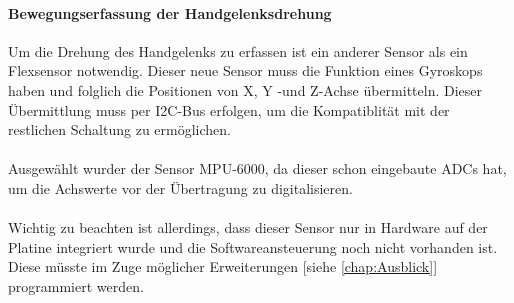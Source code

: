 \documentclass[titlepage,12pt,twoside]{article}
\begin{document}
\paragraph{Bewegungserfassung der Handgelenksdrehung}
\hfill \break
\hfill \break
Um die Drehung des Handgelenks zu erfassen ist ein anderer Sensor als ein Flexsensor notwendig. Dieser neue Sensor muss die 
Funktion eines Gyroskops haben und folglich die Positionen von X, Y -und Z-Achse übermitteln. Dieser Übermittlung muss per
I2C-Bus erfolgen, um die Kompatiblität mit der restlichen Schaltung zu ermöglichen. \\
\\
Ausgewählt wurder der Sensor MPU-6000, da dieser schon eingebaute ADCs hat, um die Achswerte vor der Übertragung zu digitalisieren. \\
\\
Wichtig zu beachten ist allerdings, dass dieser Sensor nur in Hardware auf der Platine integriert wurde und 
die Softwareansteuerung noch nicht vorhanden ist. Diese müsste im Zuge möglicher Erweiterungen [siehe \textcolor{blue}{\autoref{chap:Ausblick}}]
programmiert werden. \\
\\
\end{document}
